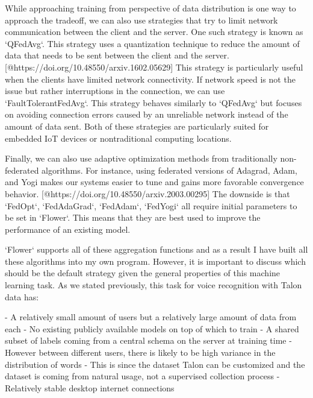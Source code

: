 \documentclass[manuscript,screen,review]{acmart}
\begin{document}
While approaching training from perspective of data distribution is one way to approach the tradeoff, we can also use strategies that try to limit network communication between the client and the server. One such strategy is known as `QFedAvg`. This strategy uses a quantization technique to reduce the amount of data that needs to be sent between the client and the server. [@https://doi.org/10.48550/arxiv.1602.05629] This strategy is particularly useful when the clients have limited network connectivity. If network speed is not the issue but rather interruptions in the connection, we can use `FaultTolerantFedAvg`. This strategy behaves similarly to `QFedAvg` but focuses on avoiding connection errors caused by an unreliable network instead of the amount of data sent. Both of these strategies are particularly suited for embedded IoT devices or nontraditional computing locations.

Finally, we can also use adaptive optimization methods from traditionally non-federated algorithms. For instance, using federated versions of Adagrad, Adam, and Yogi makes our systems easier to tune and gains more favorable convergence behavior. [@https://doi.org/10.48550/arxiv.2003.00295] The downside is that `FedOpt`, `FedAdaGrad`, `FedAdam`, `FedYogi` all require initial parameters to be set in `Flower`. This means that they are best used to improve the performance of an existing model.

`Flower` supports all of these aggregation functions and as a result I have built all these algorithms into my own program. However, it is important to discuss which should be the default strategy given the general properties of this machine learning task. As we stated previously, this task for voice recognition with Talon data has:

- A relatively small amount of users but a relatively large amount of data from each
- No existing publicly available models on top of which to train
- A shared subset of labels coming from a central schema on the server at training time
  - However between different users, there is likely to be high variance in the distribution of words
  - This is since the dataset Talon can be customized and the dataset is coming from natural usage, not a supervised collection process
- Relatively stable desktop internet connections
\end{document}
